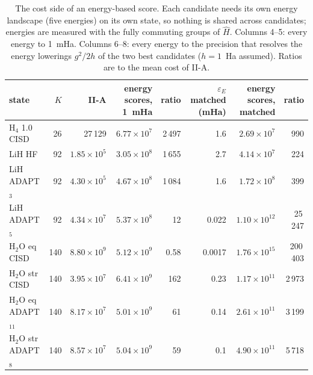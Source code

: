 \documentclass[aps,pra,reprint,superscriptaddress,nofootinbib]{revtex4-2}
\begin{document}
\begin{table}[!htb]
\centering\small
\caption{The cost side of an energy-based score. Each candidate needs its own energy landscape (five energies) on its own state, so nothing is shared across candidates; energies are measured with the fully commuting groups of $\hat H$. Columns 4--5: every energy to 1~mHa. Columns 6--8: every energy to the precision that resolves the energy lowerings $g^2/2h$ of the two best candidates ($h=1$~Ha assumed). Ratios are to the mean cost of II-A.}
\label{tab:score}
\begin{tabular}{lrrrrrrr}
\toprule
state & $K$ & II-A & energy scores, 1~mHa & ratio & $\varepsilon_E$ matched (mHa) & energy scores, matched & ratio \\
\midrule
H$_4$ 1.0 CISD & 26 & 27\,129 & $6.77\times10^{7}$ & 2\,497 & 1.6 & $2.69\times10^{7}$ & 990 \\
LiH HF & 92 & $1.85\times10^{5}$ & $3.05\times10^{8}$ & 1\,655 & 2.7 & $4.14\times10^{7}$ & 224 \\
LiH ADAPT$_3$ & 92 & $4.30\times10^{5}$ & $4.67\times10^{8}$ & 1\,084 & 1.6 & $1.72\times10^{8}$ & 399 \\
LiH ADAPT$_5$ & 92 & $4.34\times10^{7}$ & $5.37\times10^{8}$ & 12 & 0.022 & $1.10\times10^{12}$ & 25\,247 \\
H$_2$O eq CISD & 140 & $8.80\times10^{9}$ & $5.12\times10^{9}$ & 0.58 & 0.0017 & $1.76\times10^{15}$ & 200\,403 \\
H$_2$O str CISD & 140 & $3.95\times10^{7}$ & $6.41\times10^{9}$ & 162 & 0.23 & $1.17\times10^{11}$ & 2\,973 \\
H$_2$O eq ADAPT$_{11}$ & 140 & $8.17\times10^{7}$ & $5.01\times10^{9}$ & 61 & 0.14 & $2.61\times10^{11}$ & 3\,199 \\
H$_2$O str ADAPT$_8$ & 140 & $8.57\times10^{7}$ & $5.04\times10^{9}$ & 59 & 0.1 & $4.90\times10^{11}$ & 5\,718 \\
\bottomrule
\end{tabular}
\end{table}
\end{document}
